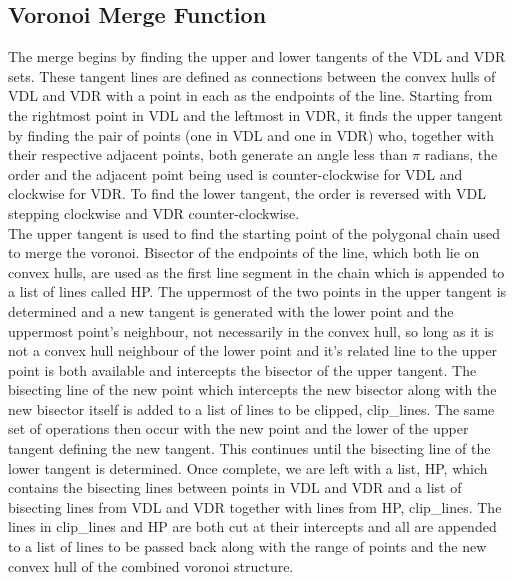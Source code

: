 \subsection{Voronoi Merge Function}
The merge begins by finding the upper and lower tangents of the VDL and VDR sets. These tangent lines are defined as connections between the convex hulls of VDL and VDR with a point in each as the endpoints of the line. Starting from the rightmost point in VDL and the leftmost in VDR, it finds the upper tangent by finding the pair of points (one in VDL and one in VDR) who, together with their respective adjacent points, both generate an angle less than $\pi$ radians, the order and the adjacent point being used is counter-clockwise for VDL and clockwise for VDR. To find the lower tangent, the order is reversed with VDL stepping clockwise and VDR counter-clockwise.
\\
The upper tangent is used to find the starting point of the polygonal chain used to merge the voronoi. Bisector of the endpoints of the line, which both lie on convex hulls, are used as the first line segment in the chain which is appended to a list of lines called HP. The uppermost of the two points in the upper tangent is determined and a new tangent is generated with the lower point and the uppermost point's neighbour, not necessarily in the convex hull, so long as it is not a convex hull neighbour of the lower point and it's related line to the upper point is both available and intercepts the bisector of the upper tangent. The bisecting line of the new point which intercepts the new bisector along with the new bisector itself is added to a list of lines to be clipped, clip\_lines. The same set of operations then occur with the new point and the lower of the upper tangent defining the new tangent. This continues until the bisecting line of the lower tangent is determined. Once complete, we are left with a list, HP, which contains the bisecting lines between points in VDL and VDR and a list of bisecting lines from VDL and VDR together with lines from HP, clip\_lines. The lines in clip\_lines and HP are both cut at their intercepts and all are appended to a list of lines to be passed back along with the range of points and the new convex hull of the combined voronoi structure.